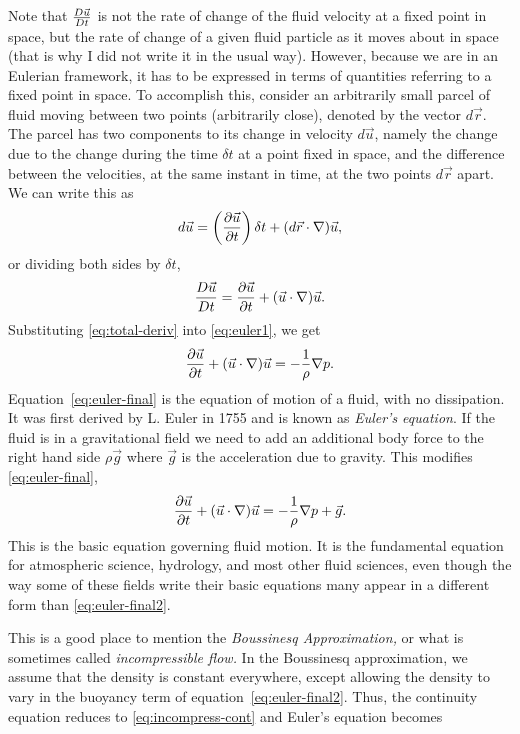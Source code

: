 \documentclass[12pt,twoside]{article}
\begin{document}
Note that ${{D \vec u} \over {D t}}$ is not the rate of change of the fluid
velocity at a fixed point in space, but the rate of change of a given fluid
particle as it moves about in space (that is why I did not write it in the
usual way).   However, because we are in an Eulerian framework, it has to be
expressed in terms of quantities referring to a fixed point in space.   To
accomplish this, consider an arbitrarily small parcel of fluid moving between two
points (arbitrarily close), denoted by the vector $d \vec r$. The parcel has two
components to its change in velocity $d\vec u$, namely the change due to the
change during the time $\delta t$ at a point fixed in space, and the
difference between the velocities, at the same instant in time, at the two
points $d \vec r$ apart.   We can write this as
\begin{equation}
d \vec u = \left ({{\partial \vec u} \over {\partial t}} \right ) \delta t +
(d\vec r \cdot \nabla) \vec u,
\end{equation}
or dividing both sides by $\delta t$,
\begin{equation} 
{{D \vec u} \over {D t}} = {{\partial \vec u} \over {\partial t}} + 
(\vec u \cdot \nabla) \vec u.
\label{eq:total-deriv}
\end{equation}
Substituting \ref{eq:total-deriv} into \ref{eq:euler1}, we get
\begin{equation}  
{{\partial \vec u} \over {\partial t}} + (\vec u \cdot \nabla) \vec u =
- {1\over\rho}\nabla p.
\label{eq:euler-final}
\end{equation}
Equation~\ref{eq:euler-final} is the equation of motion of a fluid, with no
dissipation.   It was first derived by L. Euler in 1755 and is known as {\em
Euler's equation}.   If the fluid is in a gravitational field we need to add an
additional body force to the right hand side $\rho \vec g$ where $\vec g$ is
the acceleration due to gravity.  This modifies \ref{eq:euler-final}, 
\begin{equation}   
{{\partial \vec u} \over {\partial t}} + ( \vec u \cdot \nabla ) \vec u = 
- {1\over\rho}\nabla p + \vec g.
\label{eq:euler-final2}
\end{equation}
This is the basic equation governing fluid motion.  It is the fundamental
equation for atmospheric science, hydrology, and most other fluid sciences,
even though the way some of these fields write their basic equations many
appear in a different form than \ref{eq:euler-final2}.

This is a good place to mention the {\em Boussinesq Approximation,} or what is
sometimes called {\em incompressible flow.}  In the Boussinesq approximation, we
assume that the density is constant everywhere, except allowing the density to
vary in the buoyancy term of equation~\ref{eq:euler-final2}.  Thus, the
continuity equation reduces to
\ref{eq:incompress-cont} and Euler's equation becomes
\end{document}
